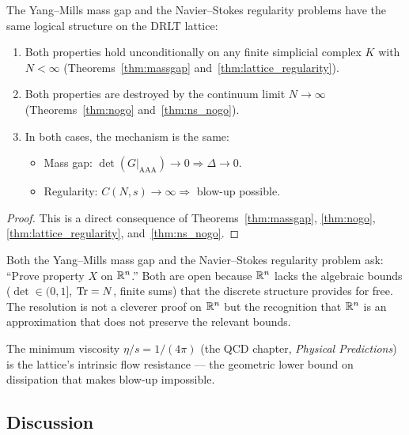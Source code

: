 \begin{theorem}
\label{thm:structural_equivalence}
The Yang--Mills mass gap and the Navier--Stokes regularity problems
have the same logical structure on the DRLT lattice:
\begin{enumerate}
\item Both properties hold unconditionally on any finite simplicial
  complex $K$ with $N < \infty$
  (Theorems~\ref{thm:massgap} and~\ref{thm:lattice_regularity}).
\item Both properties are destroyed by the continuum limit
  $N \to \infty$
  (Theorems~\ref{thm:nogo} and~\ref{thm:ns_nogo}).
\item In both cases, the mechanism is the same:
  \begin{itemize}
  \item Mass gap: $\det(G|_{\mathrm{AAA}}) \to 0 \Rightarrow
    \Delta \to 0$.
  \item Regularity: $C(N,s) \to \infty \Rightarrow$ blow-up possible.
  \end{itemize}
\end{enumerate}
\end{theorem}

\begin{proof}
This is a direct consequence of Theorems~\ref{thm:massgap},
\ref{thm:nogo}, \ref{thm:lattice_regularity},
and~\ref{thm:ns_nogo}.
\end{proof}

\begin{remark}
Both the Yang--Mills mass gap and the Navier--Stokes regularity
problem ask: ``Prove property $X$ on $\mathbb{R}^n$.''  Both are open
because $\mathbb{R}^n$ lacks the algebraic bounds ($\det \in (0,1]$,
$\operatorname{Tr} = N$, finite sums) that the discrete structure provides for free.
The resolution is not a cleverer proof on $\mathbb{R}^n$ but the recognition
that $\mathbb{R}^n$ is an approximation that does not preserve the relevant
bounds.

The minimum viscosity $\eta/s = 1/(4\pi)$
(the QCD chapter, \textit{Physical Predictions}) is the lattice's intrinsic flow resistance
--- the geometric lower bound on dissipation that makes blow-up
impossible.
\end{remark}

\subsection{Discussion}
\label{sec:discussion}

